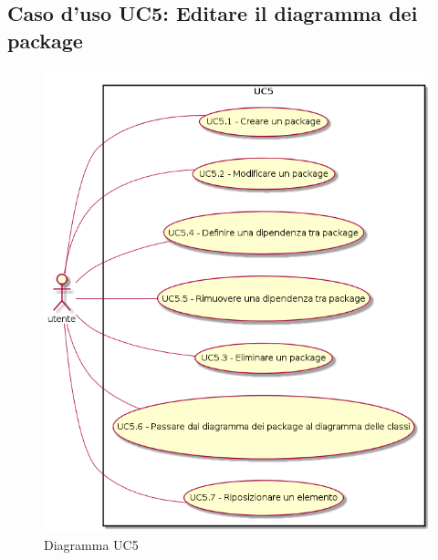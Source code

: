 \documentclass[../AnalisiDeiRequisiti.tex]{subfiles}
\begin{document}
			\subsection{Caso d'uso UC5: Editare il diagramma dei package}
			\begin{figure} [H]
				\centering
				\includegraphics[scale=0.45]{./Figures/UC5.png}
				\caption{Diagramma UC5}\label{}
			\end{figure}
\end{document}

